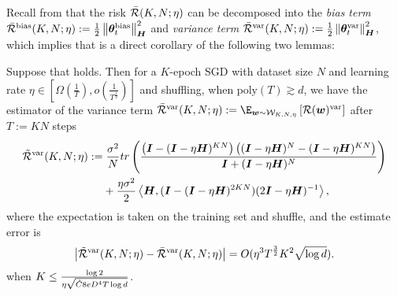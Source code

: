 Recall from  that the risk $\Bar{\mathcal{R}}(K,N;\eta)$ can be decomposed into the \textit{bias term} $\Bar{\mathcal{R}}^{\mathrm{bias}}(K,N;\eta):= \frac{1}{2}\left\|{\bm{\theta}}_t^{\mathrm{bias}}\right\|_{{\bm{H}}}^2$ and \textit{variance term} $\Bar{\mathcal{R}}^{\mathrm{var}}(K,N;\eta):=\frac{1}{2}\left\|{\bm{\theta}}_t^{\mathrm{var}}\right\|_{{\bm{H}}}^2$, which implies that  is a direct corollary of the following two lemmas:
\begin{lemma} \label{lem:variance-estimate}
    Suppose that  holds. Then for a $K$-epoch SGD with dataset size $N$ and learning rate $\eta \in [\Omega(\frac{1}{T}),o(\frac{1}{T^{\frac{1}{2}}})]$ and shuffling, when $\text{poly}(T)\gtrsim d$, we have the estimator of the variance term $\bar{\cR}^{\var}(K,N;\eta):= \E_{\vw \sim \cW_{K,N,\eta}}\left[\cR(\vw)^{\var}\right]$ after $T:=KN$ steps
    \begin{align*}
        \Tilde{\mathcal{R}}^{\mathrm{var}}(K,N;\eta)&:=\frac{\sigma^2}{N} tr\left(\frac{\left({\bm{I}} -({\bm{I}} -\eta{\bm{H}})^{KN}\right)\left(({\bm{I}} -\eta{\bm{H}})^{N} -({\bm{I}} -\eta{\bm{H}})^{KN}\right)}{{\bm{I}} + ({\bm{I}} -\eta{\bm{H}})^N}\right)\\
    &~~~~+\frac{\eta\sigma^2}{2}\left\langle {\bm{H}},({\bm{I}} - ({\bm{I}} - \eta {\bm{H}})^{2KN})(2{\bm{I}}-\eta{\bm{H}})^{-1}\right\rangle,
    \end{align*}
    where the expectation is taken on the training set and shuffle, and the estimate error is 
    \begin{align*}
        \left|\Tilde{\mathcal{R}}^{\mathrm{var}}(K,N;\eta) - \bar{\mathcal{R}}^{\mathrm{var}}(K,N;\eta)\right| = O(\eta^3T^{\frac{3}{2}}K^2\sqrt{\log d}).
    \end{align*}
    when $K \leq \frac{\log 2}{\eta \sqrt{\Tilde{C}8eD^4T\log d}}$.
\end{lemma}
